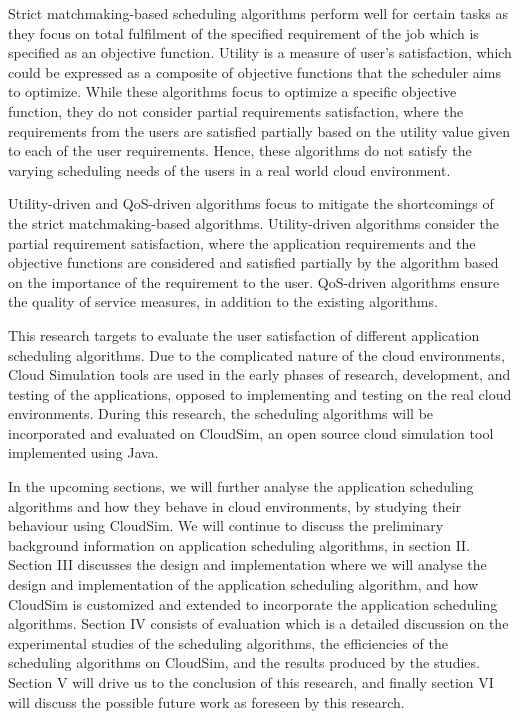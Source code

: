 \documentclass[times, 10pt,twocolumn]{article}
\begin{document}
Strict matchmaking-based scheduling algorithms perform well for certain tasks as they focus on total fulfilment of the specified requirement of the job which is specified as an objective function. Utility is a measure of user's satisfaction, which could be expressed as a composite of objective functions that the scheduler aims to optimize. While these algorithms focus to optimize a specific objective function, they do not consider partial requirements satisfaction, where the requirements from the users are satisfied partially based on the utility value given to each of the user requirements\cite{resumo}. Hence, these algorithms do not satisfy the varying scheduling needs of the users in a real world cloud environment.

Utility-driven and QoS-driven algorithms focus to mitigate the shortcomings of the strict matchmaking-based algorithms. Utility-driven algorithms consider the partial requirement satisfaction, where the application requirements and the objective functions are considered and satisfied partially by the algorithm based on the importance of the requirement to the user. QoS-driven algorithms ensure the quality of service measures, in addition to the existing algorithms. 

This research targets to evaluate the user satisfaction of different application scheduling algorithms. Due to the complicated nature of the cloud environments, Cloud Simulation tools are used in the early phases of research, development, and testing of the applications, opposed to implementing and testing on the real cloud environments. During this research, the scheduling algorithms will be incorporated and evaluated on CloudSim\cite{cloudsim}, an open source cloud simulation tool implemented using Java. 

In the upcoming sections, we will further analyse the application scheduling algorithms and how they behave in cloud environments, by studying their behaviour using CloudSim. We will continue to discuss the preliminary background information on application scheduling algorithms, in section II. Section III discusses the design and implementation where we will analyse the design and implementation of the application scheduling algorithm, and how CloudSim is customized and extended to incorporate the application scheduling algorithms. Section IV consists of evaluation which is a detailed discussion on the experimental studies of the scheduling algorithms, the efficiencies of the scheduling algorithms on CloudSim, and the results produced by the studies. Section V will drive us to the conclusion of this research, and finally section VI will discuss the possible future work as foreseen by this research.
\end{document}
